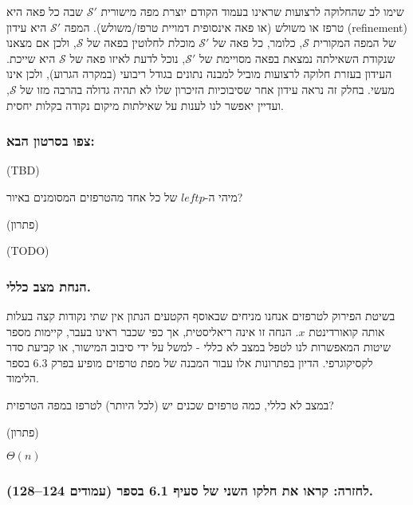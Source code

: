 \documentclass[
]{book}
\begin{document}
שימו לב שהחלוקה לרצועות שראינו בעמוד הקודם יוצרת מפה מישורית \(\mathcal{S'}\) שבה כל פאה היא טרפז או משולש (או פאה אינסופית דמויית טרפז/משולש).
המפה \(\mathcal{S'}\) היא עידון (refinement) של המפה המקורית \(\mathcal{S}\), כלומר, כל פאה של \(\mathcal{S'}\) מוכלת לחלוטין בפאה של \(\mathcal{S}\), ולכן אם מצאנו שנקודת השאילתה נמצאת בפאה מסויימת של \(\mathcal{S'}\), נוכל לדעת לאיזו פאה של \(\mathcal{S}\) היא שייכת.
העידון בעזרת חלוקה לרצועות מוביל למבנה נתונים בגודל ריבועי (במקרה הגרוע), ולכן אינו מעשי.
בחלק זה נראה עידון אחר שסיבוכיות הזיכרון שלו לא תהיה גדולה בהרבה מזו של \(\mathcal{S}\), ועדיין יאפשר לנו לענות על שאילתות מיקום נקודה בקלות יחסית.

\hypertarget{ux5e6ux5e4ux5d5-ux5d1ux5e1ux5e8ux5d8ux5d5ux5df-ux5d4ux5d1ux5d0-7}{%
\subsubsection*{צפו בסרטון הבא:}\label{ux5e6ux5e4ux5d5-ux5d1ux5e1ux5e8ux5d8ux5d5ux5df-ux5d4ux5d1ux5d0-7}}

(TBD)

מיהי ה-\(leftp\) של כל אחד מהטרפזים המסומנים באיור?

(פתרון)

(TODO)

\hypertarget{ux5d4ux5e0ux5d7ux5ea-ux5deux5e6ux5d1-ux5dbux5dcux5dcux5d9.}{%
\subsubsection*{הנחת מצב כללי.}\label{ux5d4ux5e0ux5d7ux5ea-ux5deux5e6ux5d1-ux5dbux5dcux5dcux5d9.}}

בשיטת הפירוק לטרפזים אנחנו מניחים שבאוסף הקטעים הנתון אין שתי נקודות קצה בעלות אותה קואורדינטת \(x\).
הנחה זו אינה ריאליסטית, אך כפי שכבר ראינו בעבר, קיימות מספר שיטות המאפשרות לנו לטפל במצב לא כללי - למשל על ידי סיבוב המישור, או קביעת סדר לקסיקוגרפי.
הדיון בפתרונות אלו עבור המבנה של מפת טרפזים מופיע בפרק 6.3 בספר הלימוד.

במצב לא כללי, כמה טרפזים שכנים יש (לכל היותר) לטרפז במפה הטרפזית?

(פתרון)

\(\Theta(n)\)

\hypertarget{ux5dcux5d7ux5d6ux5e8ux5d4-ux5e7ux5e8ux5d0ux5d5-ux5d0ux5ea-ux5d7ux5dcux5e7ux5d5-ux5d4ux5e9ux5e0ux5d9-ux5e9ux5dc-ux5e1ux5e2ux5d9ux5e3-6.1-ux5d1ux5e1ux5e4ux5e8-ux5e2ux5deux5d5ux5d3ux5d9ux5dd-124128.}{%
\subsubsection*{לחזרה: קראו את חלקו השני של סעיף 6.1 בספר (עמודים 124--128).}\label{ux5dcux5d7ux5d6ux5e8ux5d4-ux5e7ux5e8ux5d0ux5d5-ux5d0ux5ea-ux5d7ux5dcux5e7ux5d5-ux5d4ux5e9ux5e0ux5d9-ux5e9ux5dc-ux5e1ux5e2ux5d9ux5e3-6.1-ux5d1ux5e1ux5e4ux5e8-ux5e2ux5deux5d5ux5d3ux5d9ux5dd-124128.}}
\end{document}
